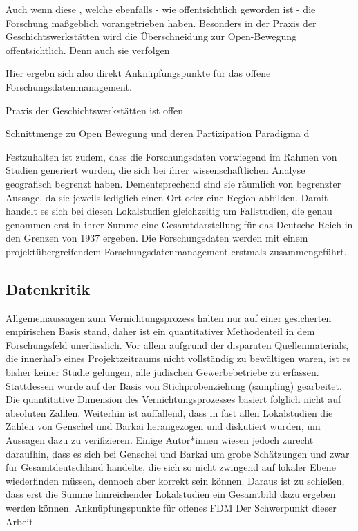 Auch wenn diese , welche ebenfalls - wie offentsichtlich geworden ist - die Forschung maßgeblich vorangetrieben haben. Besonders in der Praxis der Geschichtswerkstätten wird die Überschneidung zur Open-Bewegung offentsichtlich. Denn auch sie verfolgen 

Hier ergebn sich also direkt Anknüpfungspunkte für das offene Forschungsdatenmanagement.

Praxis der Geschichtswerkstätten ist offen

Schnittmenge zu Open Bewegung und deren Partizipation Paradigma
d

Festzuhalten ist zudem, dass die Forschungsdaten vorwiegend im Rahmen von Studien generiert wurden, die sich bei ihrer wissenschaftlichen Analyse geografisch begrenzt haben. Dementsprechend sind sie räumlich von begrenzter Aussage, da sie jeweils lediglich einen Ort oder eine Region abbilden. Damit handelt es sich bei diesen Lokalstudien gleichzeitig um Fallstudien, die genau genommen erst in ihrer Summe eine Gesamtdarstellung für das Deutsche Reich in den Grenzen von 1937 ergeben. Die Forschungsdaten werden mit einem projektübergreifendem Forschungsdatenmanagement erstmals zusammengeführt.

\subsection{Datenkritik}
Allgemeinaussagen zum Vernichtungsprozess halten nur auf einer gesicherten empirischen Basis stand, daher ist ein quantitativer Methodenteil in dem Forschungsfeld unerlässlich. Vor allem aufgrund der disparaten Quellenmaterials, die innerhalb eines Projektzeitraums nicht vollständig zu bewältigen waren, ist es bisher keiner Studie gelungen, alle jüdischen Gewerbebetriebe zu erfassen. Stattdessen wurde auf der Basis von Stichprobenziehung (sampling) gearbeitet. Die quantitative Dimension des Vernichtungsprozesses basiert folglich nicht auf absoluten Zahlen.
Weiterhin ist auffallend, dass in fast allen Lokalstudien die Zahlen von Genschel und Barkai herangezogen und diskutiert wurden, um Aussagen dazu zu verifizieren. Einige Autor*innen wiesen jedoch zurecht daraufhin, dass es sich bei Genschel und Barkai um grobe Schätzungen und zwar für Gesamtdeutschland handelte, die sich so nicht zwingend auf lokaler Ebene wiederfinden müssen, dennoch aber korrekt sein können. Daraus ist zu schießen, dass erst die Summe hinreichender Lokalstudien ein Gesamtbild dazu ergeben werden können.
Anknüpfungspunkte für offenes FDM
Der Schwerpunkt dieser Arbeit


